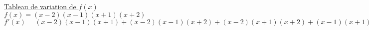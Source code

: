 \documentclass{article}
\begin{document}
\underline{Tableau de variation de $f(x)$}\\
                   
$f(x)=\left(x - 2\right) \left(x - 1\right) \left(x + 1\right) \left(x + 2\right)$\\
$f'(x)=\left(x - 2\right) \left(x - 1\right) \left(x + 1\right) + \left(x - 2\right) \left(x - 1\right) \left(x + 2\right) + \left(x - 2\right) \left(x + 1\right) \left(x + 2\right) + \left(x - 1\right) \left(x + 1\right) \left(x + 2\right)$\\

\end{document}
